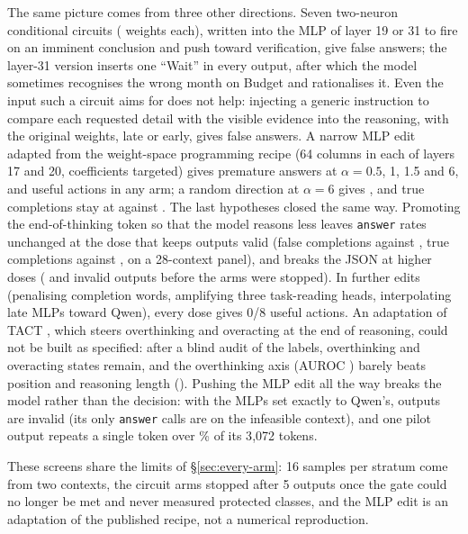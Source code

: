 
The same picture comes from three other directions. Seven two-neuron conditional circuits (\mitTwoWeights{} weights each), written into the MLP of layer 19 or 31 to fire on an imminent conclusion and push toward verification, give \mitTwoFsp{} false answers; the layer-31 version inserts one ``Wait'' in every output, after which the model sometimes recognises the wrong month on Budget and rationalises it. %
Even the input such a circuit aims for does not help: injecting a generic instruction to compare each requested detail with the visible evidence into the reasoning, with the original weights, late or early, gives \mitTwoInj{} false answers. A narrow MLP edit adapted from the weight-space programming recipe \citep{takehi2026wsp} (64 columns in each of layers 17 and 20, \ratioWeights{} coefficients targeted) gives \ratioSeries{} premature answers at $\alpha=0.5$, 1, 1.5 and 6, and \ratioUsefulAll{} useful actions in any arm; a random direction at $\alpha=6$ gives \ratioRandSix, and true completions stay at \ratioTrueRange{} against \ratioTrueOrig. %
The last hypotheses closed the same way. Promoting the end-of-thinking token so that the model reasons less leaves \texttt{answer} rates unchanged at the dose that keeps outputs valid (false completions \shortTwelveFsp{} against \shortOrigFsp, true completions \shortTwelveFsm{} against \shortOrigFsm, on a 28-context panel), and breaks the JSON at higher doses (\shortSixteenInv{} and \shortTwentyInv{} invalid outputs before the arms were stopped). In \mitOneLateN{} further edits (penalising completion words, amplifying three task-reading heads, interpolating late MLPs toward Qwen), every dose gives 0/8 useful actions. An adaptation of TACT \citep{sui2026tact}, which steers overthinking and overacting at the end of reasoning, could not be built as specified: after a blind audit of the labels, \tactOT{} overthinking and \tactOA{} overacting states remain, and the overthinking axis (AUROC \tactAuc) barely beats position and reasoning length (\tactPosLen). %
Pushing the MLP edit all the way breaks the model rather than the decision: with the MLPs set exactly to Qwen's, \attHthreefullInv{} outputs are invalid (its only \fsp{} \texttt{answer} calls are on the infeasible context), and one pilot output repeats a single token over \attHthreeRepeatPct\% of its 3{,}072 tokens. %

These screens share the limits of \S\ref{sec:every-arm}: 16 samples per stratum come from two contexts, the circuit arms stopped after 5 outputs once the gate could no longer be met and never measured protected classes, and the MLP edit is an adaptation of the published recipe, not a numerical reproduction. %


\FloatBarrier

